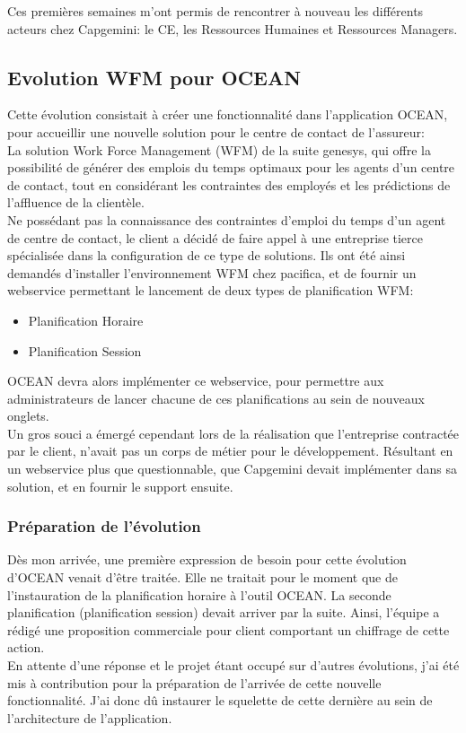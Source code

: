 \documentclass{rapport}
\begin{document}
Ces premières semaines m'ont permis de rencontrer à nouveau les différents acteurs chez Capgemini: le CE, les Ressources Humaines et Ressources Managers.\\ 

\newpage
\subsection{Evolution WFM pour OCEAN}

Cette évolution consistait à créer une fonctionnalité dans l'application OCEAN, pour accueillir une nouvelle solution pour le centre de contact de l'assureur: \\
La solution Work Force Management (WFM) de la suite genesys, qui offre la possibilité de générer des emplois du temps optimaux pour les agents d'un centre de contact, tout en considérant les contraintes des employés et les prédictions de l'affluence de la clientèle.\\

Ne possédant pas la connaissance des contraintes d'emploi du temps d'un agent de centre de contact, le client a décidé de faire appel à une entreprise tierce spécialisée dans la configuration de ce type de solutions. Ils ont été ainsi demandés d'installer l'environnement WFM chez pacifica, et de fournir un webservice permettant le lancement de deux types de planification WFM:
\begin{itemize}
  \item Planification Horaire
  \item Planification Session
\end{itemize}

OCEAN devra alors implémenter ce webservice, pour permettre aux administrateurs de lancer chacune de ces planifications au sein de nouveaux onglets.\\

Un gros souci a émergé cependant lors de la réalisation que l'entreprise contractée par le client, n'avait pas un corps de métier pour le développement. Résultant en un webservice plus que questionnable, que Capgemini devait implémenter dans sa solution, et en fournir le support ensuite.

\subsubsection{Préparation de l'évolution}

Dès mon arrivée, une première expression de besoin pour cette évolution d'OCEAN venait d'être traitée. Elle ne traitait pour le moment que de l'instauration de la planification horaire à l'outil OCEAN. La seconde planification (planification session) devait arriver par la suite. Ainsi, l'équipe a rédigé une proposition commerciale pour client comportant un chiffrage de cette action.\\
En attente d'une réponse et le projet étant occupé sur d'autres évolutions, j'ai été mis à contribution pour la préparation de l'arrivée de cette nouvelle fonctionnalité. J'ai donc dû instaurer le squelette de cette dernière au sein de l'architecture de l'application.\\
\end{document}
